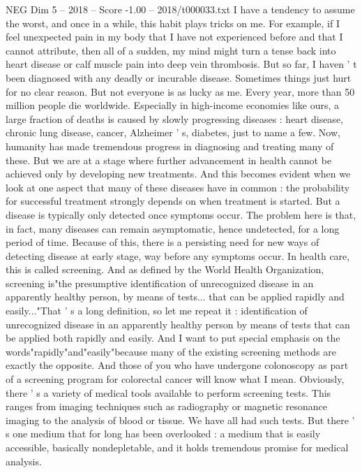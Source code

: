 \begin{textsample}{NEG Dim 5 – 2018 – Score -1.00 – 2018/t000033.txt}  \label{ex:f5_neg_016}
I have a tendency to assume the worst, and once in a while, this habit plays tricks on me.
For example, if I feel unexpected pain in my body that I have not experienced before and that I cannot attribute, then all of a sudden, my mind might turn a tense back into heart disease or calf muscle pain into deep vein thrombosis.
But so far, I haven ' t been diagnosed with any deadly or incurable disease.
Sometimes things just hurt for no clear reason.
But not everyone is as lucky as me.
Every year, more than 50 million people die worldwide.
Especially in high-income economies like ours, a large fraction of deaths is caused by slowly progressing diseases : heart disease, chronic lung disease, cancer, Alzheimer ' s, diabetes, just to name a few.
Now, humanity has made tremendous progress in diagnosing and treating many of these.
But we are at a stage where further advancement in health cannot be achieved only by developing new treatments.
And this becomes evident when we look at one aspect that many of these diseases have in common : the probability for successful treatment strongly depends on when treatment is started.
But a disease is typically only detected once symptoms occur.
The problem here is that, in fact, many diseases can remain asymptomatic, hence undetected, for a long period of time.
Because of this, there is a persisting need for new ways of detecting disease at early stage, way before any symptoms occur.
In health care, this is called screening.
And as defined by the World Health Organization, screening is"the presumptive identification of unrecognized disease in an apparently healthy person, by means of tests... that can be applied rapidly and easily..."That ' s a long definition, so let me repeat it : identification of unrecognized disease in an apparently healthy person by means of tests that can be applied both rapidly and easily.
And I want to put special emphasis on the words"rapidly"and"easily"because many of the existing screening methods are exactly the opposite.
And those of you who have undergone colonoscopy as part of a screening program for colorectal cancer will know what I mean.
Obviously, there ' s a variety of medical tools available to perform screening tests.
This ranges from imaging techniques such as radiography or magnetic resonance imaging to the analysis of blood or tissue.
We have all had such tests.
But there ' s one medium that for long has been overlooked : a medium that is easily accessible, basically nondepletable, and it holds tremendous promise for medical analysis.

\end{textsample}
